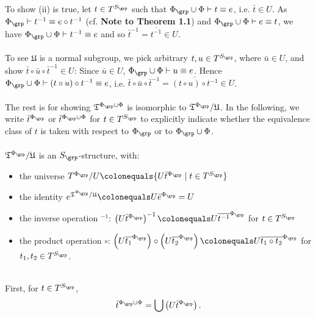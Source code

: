 \begin{enumerate}[1.]
To show (ii) is true, let $t \in T^{S_\grp}$ such that $\Phi_\grp \cup \Phi \vdash t \equiv e$, i.e. $\bar{t} \in U$. As $\Phi_\grp \vdash t^{-1} \equiv e \circ t^{-1}$ (cf. \textbf{Note to Theorem 1.1}) and $\Phi_\grp \cup \Phi \vdash e \equiv t$, we have $\Phi_\grp \cup \Phi \vdash t^{-1} \equiv e$ and so $\bar{t}^{-1} = \overline{t^{-1}} \in U$.\\
\ \\
To see $\mathfrak{U}$ is a normal subgroup, we pick arbitrary $t, u \in T^{S_\grp}$, where $\bar{u} \in U$, and show $\bar{t} \circ \bar{u} \circ \bar{t}^{-1} \in U$: Since $\bar{u} \in U$, $\Phi_\grp \cup \Phi \vdash u \equiv e$. Hence $\Phi_\grp \cup \Phi \vdash (t \circ u) \circ t^{-1} \equiv e$, i.e. $\bar{t} \circ \bar{u} \circ \bar{t}^{-1} = \overline{(t \circ u) \circ t^{-1}} \in U$.\\
\ \\
The rest is for showing $\mathfrak{T}^{\Phi_\grp \cup \Phi}$ is isomorphic to $\mathfrak{T}^{\Phi_\grp} \slash \mathfrak{U}$. In the following, we write $\bar{t}^{\Phi_\grp}$ or $\bar{t}^{\Phi_\grp \cup \Phi}$ for $t \in T^{S_\grp}$ to explicitly indicate whether the equivalence class of $t$ is taken with respect to $\Phi_\grp$ or to $\Phi_\grp \cup \Phi$.\\
\ \\
$\mathfrak{T}^{\Phi_\grp} \slash \mathfrak{U}$ is an $S_\grp$-structure, with:
\begin{itemize}
\item the universe $T^{\Phi_\grp} \slash U \colonequals \{ U\bar{t}^{\Phi_\grp} \mid t \in T^{S_\grp} \}$
\item the identity $e^{\mathfrak{T}^{\Phi_\grp} \slash \mathfrak{U}} \colonequals U\bar{e}^{\Phi_\grp} = U$
\item the inverse operation $^{-1}$: $\left(U\bar{t}^{\Phi_\grp}\right)^{-1} \colonequals U\overline{t^{-1}}^{\Phi_\grp}$ for $t \in T^{S_\grp}$
\item the product operation $\circ$: $\left(U\overline{t_1}^{\Phi_\grp}\right) \circ \left(U\overline{t_2}^{\Phi_\grp}\right) \colonequals U\overline{t_1 \circ t_2}^{\Phi_\grp}$ for $t_1, t_2 \in T^{S_\grp}$.
\end{itemize}
\ \\
First, for $t \in T^{S_\grp}$,
\[
\bar{t}^{\Phi_\grp \cup \Phi} = \bigcup \left( U \bar{t}^{\Phi_\grp} \right).
\]

\end{enumerate}
